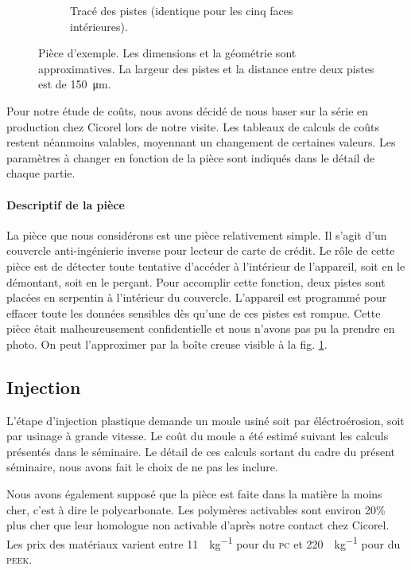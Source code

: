 \begin{figure}[h]
\begin{subfigure}[t]{0.4\textwidth}
                \caption{Tracé des pistes (identique pour les cinq faces intérieures).}
        \end{subfigure}

        \caption{Pièce d'exemple. Les dimensions et la géométrie sont approximatives. La largeur des pistes et la distance entre deux pistes est de \SI{150}{\micro\meter}.}
        \label{fig:example-part}
\end{figure}
Pour notre étude de coûts, nous avons décidé de nous baser sur la série en production chez Cicorel lors de notre visite.
Les tableaux de calculs de coûts restent néanmoins valables, moyennant un changement de certaines valeurs.
Les paramètres à changer en fonction de la pièce sont indiqués dans le détail de chaque partie.


\paragraph{Descriptif de la pièce}
La pièce que nous considérons est une pièce relativement simple.
Il s'agit d'un couvercle anti-ingénierie inverse pour lecteur de carte de crédit.
Le rôle de cette pièce est de détecter toute tentative d'accéder à l'intérieur de l'appareil, soit en le démontant, soit en le perçant.
Pour accomplir cette fonction, deux pistes sont placées en serpentin à l'intérieur du couvercle.
L'appareil est programmé pour effacer toute les données sensibles dès qu'une de ces pistes est rompue.
Cette pièce était malheureusement confidentielle et nous n'avons pas pu la prendre en photo.
On peut l'approximer par la boîte creuse visible à la fig. \ref{fig:example-part}.


\subsection{Injection}

L'étape d'injection plastique demande un moule usiné soit par éléctroérosion, soit par usinage à grande vitesse.
Le coût du moule a été estimé suivant les calculs présentés dans le séminaire\cite{electroerosion-2013}.
Le détail de ces calculs sortant du cadre du présent séminaire, nous avons fait le choix de ne pas les inclure. 

Nous avons également supposé que la pièce est faite dans la matière la moins cher, c'est à dire le polycarbonate.
Les polymères activables sont environ 20\% plus cher que leur homologue non activable d'après notre contact chez Cicorel.
Les prix des matériaux varient entre \SI{11}{\chf\per\kilogram} pour du \textsc{pc} et \SI{220}{\chf\per\kilogram} pour du \textsc{peek}.

